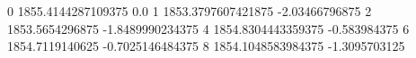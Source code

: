 0 1855.4144287109375 0.0
1 1853.3797607421875 -2.03466796875
2 1853.5654296875 -1.8489990234375
4 1854.8304443359375 -0.583984375
6 1854.7119140625 -0.7025146484375
8 1854.1048583984375 -1.3095703125
